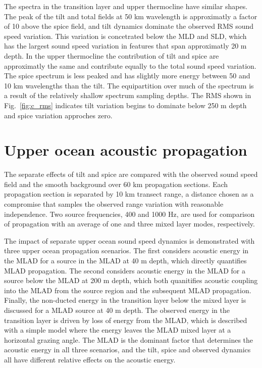 \documentclass[preprint,NumberedRefs]{JASA}
\begin{document}
The spectra in the transition layer and upper thermocline have similar shapes. The peak of the tilt and total fields at 50 km wavelength is approximatly a factor of 10 above the spice field, and tilt dynamics dominate the observed RMS sound speed variation. This variation is concetrated below the MLD and SLD, which has the largest sound speed variation in features that span approximatly 20 m depth. In the upper thermocline the contribution of tilt and spice are approximatly the same and contribute equally to the total sound speed variation. The spice spectrum is less peaked and has slightly more energy between 50 and 10 km wavelengths than the tilt. The equipartition over much of the spectrum is a result of the relatively shallow spectrum sampling depths. The RMS shown in Fig.~\ref{fig:c_rms} indicates tilt variation begins to dominate below 250 m depth and spice variation approches zero.

\section{\label{sec:propagation}Upper ocean acoustic propagation}
The separate effects of tilt and spice are compared with the observed sound speed field and the smooth background over 60 km propagation sections. Each propagation section is separated by 10 km transect range, a distance chosen as a compromise that samples the observed range variation with reasonable independence. Two source frequencies, 400 and 1000 Hz, are used for comparison of propagation with an average of one and three mixed layer modes, respectively.

The impact of separate upper ocean sound speed dynamics is demonstrated with three upper ocean propagation scenarios. The first considers acoustic energy in the MLAD for a source in the MLAD at 40 m depth, which directly quantifies MLAD propagation. The second considers acoustic energy in the MLAD for a source below the MLAD at 200 m depth, which both quanitifies acoustic coupling into the MLAD from the source region and the subsequent MLAD propagation. Finally, the non-ducted energy in the transition layer below the mixed layer is discussed for a MLAD source at 40 m depth. The observed energy in the transition layer is driven by loss of energy from the MLAD, which is described with a simple model where the energy leaves the MLAD mixed layer at a horizontal grazing angle. The MLAD is the dominant factor that determines the acoustic energy in all three scenarios, and the tilt, spice and observed dynamics all have different relative effects on the acoustic energy.
\end{document}
